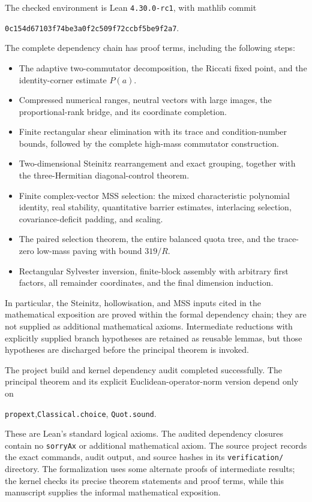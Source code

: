 \documentclass[11pt]{article}
\theoremstyle{remark}
\numberwithin{equation}{section}
\begin{document}
The checked environment is Lean \texttt{4.30.0-rc1}, with mathlib commit
\begin{center}\small\texttt{0c154d67103f74be3a0f2c509f72ccbf5be9f2a7}.\end{center}
The complete dependency chain has proof terms, including the following steps:
\begin{itemize}
\item The adaptive two-commutator decomposition, the Riccati fixed point,
      and the identity-corner estimate $P(a)$.
\item Compressed numerical ranges, neutral vectors with large images,
      the proportional-rank bridge, and its coordinate completion.
\item Finite rectangular shear elimination with its trace and condition-number
      bounds, followed by the complete high-mass commutator construction.
\item Two-dimensional Steinitz rearrangement and exact grouping, together
      with the three-Hermitian diagonal-control theorem.
\item Finite complex-vector MSS selection: the mixed characteristic
      polynomial identity, real stability, quantitative barrier estimates,
      interlacing selection, covariance-deficit padding, and scaling.
\item The paired selection theorem, the entire balanced quota tree, and
      the trace-zero low-mass paving with bound $319/R$.
\item Rectangular Sylvester inversion, finite-block assembly with arbitrary
      first factors, all remainder coordinates, and the final dimension induction.
\end{itemize}
In particular, the Steinitz, hollowisation, and MSS inputs cited in the
mathematical exposition are proved within the formal dependency chain; they
are not supplied as additional mathematical axioms. Intermediate reductions
with explicitly supplied branch hypotheses are retained as reusable lemmas,
but those hypotheses are discharged before the principal theorem is invoked.

The project build and kernel dependency audit completed successfully. The
principal theorem and its explicit Euclidean-operator-norm version depend only
on
\begin{center}\texttt{propext},\quad\texttt{Classical.choice},\quad
\texttt{Quot.sound}.\end{center}
These are Lean's standard logical axioms. The audited dependency closures
contain no \texttt{sorryAx} or additional mathematical axiom. The source project
records the exact commands, audit output, and source hashes in its
\texttt{verification/} directory. The formalization uses some alternate
proofs of intermediate results; the kernel checks its precise theorem
statements and proof terms, while this manuscript supplies the informal
mathematical exposition.
\end{document}
